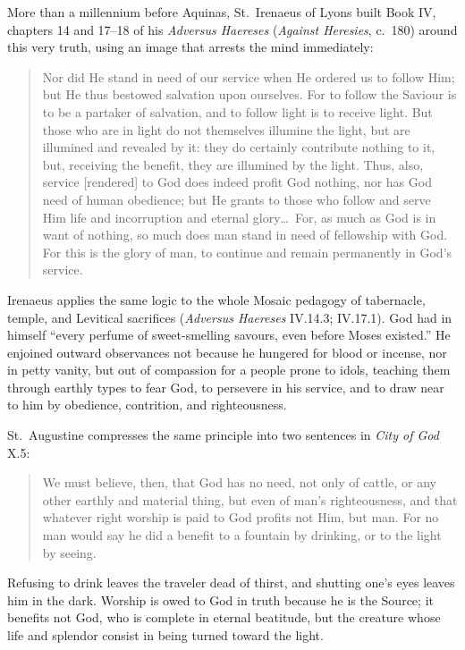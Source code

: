More than a millennium before Aquinas, St.\ Irenaeus of Lyons built Book IV, chapters 14 and 17--18 of his \emph{Adversus Haereses} (\emph{Against Heresies}, c.\ 180) around this very truth, using an image that arrests the mind immediately:

\begin{quote}
Nor did He stand in need of our service when He ordered us to follow Him; but He thus bestowed salvation upon ourselves. For to follow the Saviour is to be a partaker of salvation, and to follow light is to receive light. But those who are in light do not themselves illumine the light, but are illumined and revealed by it: they do certainly contribute nothing to it, but, receiving the benefit, they are illumined by the light. Thus, also, service [rendered] to God does indeed profit God nothing, nor has God need of human obedience; but He grants to those who follow and serve Him life and incorruption and eternal glory\dots\ For, as much as God is in want of nothing, so much does man stand in need of fellowship with God. For this is the glory of man, to continue and remain permanently in God's service.
\end{quote}

Irenaeus applies the same logic to the whole Mosaic pedagogy of tabernacle, temple, and Levitical sacrifices (\emph{Adversus Haereses} IV.14.3; IV.17.1). God had in himself ``every perfume of sweet-smelling savours, even before Moses existed.'' He enjoined outward observances not because he hungered for blood or incense, nor in petty vanity, but out of compassion for a people prone to idols, teaching them through earthly types to fear God, to persevere in his service, and to draw near to him by obedience, contrition, and righteousness.

St.\ Augustine compresses the same principle into two sentences in \emph{City of God} X.5:

\begin{quote}
We must believe, then, that God has no need, not only of cattle, or any other earthly and material thing, but even of man's righteousness, and that whatever right worship is paid to God profits not Him, but man. For no man would say he did a benefit to a fountain by drinking, or to the light by seeing.
\end{quote}

Refusing to drink leaves the traveler dead of thirst, and shutting one's eyes leaves him in the dark. Worship is owed to God in truth because he is the Source; it benefits not God, who is complete in eternal beatitude, but the creature whose life and splendor consist in being turned toward the light.
